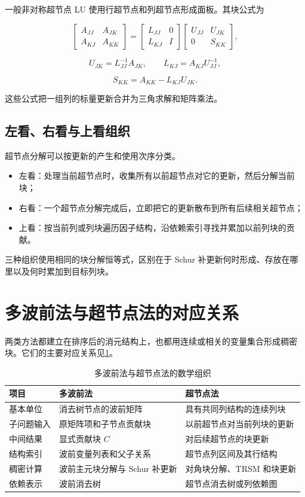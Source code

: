 一般非对称超节点 LU 使用行超节点和列超节点形成面板。其块公式为

\[
\begin{bmatrix}
A_{JJ}&A_{JK}\\
A_{KJ}&A_{KK}
\end{bmatrix}
=
\begin{bmatrix}
L_{JJ}&0\\L_{KJ}&I
\end{bmatrix}
\begin{bmatrix}
U_{JJ}&U_{JK}\\0&S_{KK}
\end{bmatrix},
\]

\[
U_{JK}=L_{JJ}^{-1}A_{JK},\qquad
L_{KJ}=A_{KJ}U_{JJ}^{-1},
\]

\[
S_{KK}=A_{KK}-L_{KJ}U_{JK}.
\]

这些公式把一组列的标量更新合并为三角求解和矩阵乘法。

\subsection{左看、右看与上看组织}

超节点分解可以按更新的产生和使用次序分类。

\begin{itemize}
  \item 左看：处理当前超节点时，收集所有以前超节点对它的更新，然后分解当前块；
  \item 右看：一个超节点分解完成后，立即把它的更新散布到所有后续相关超节点；
  \item 上看：按当前列或列块遍历因子结构，沿依赖索引寻找并累加以前列块的贡献。
\end{itemize}

三种组织使用相同的块分解恒等式，区别在于 Schur 补更新何时形成、存放在哪里以及何时累加到目标列块。

\section{多波前法与超节点法的对应关系}

两类方法都建立在排序后的消元结构上，也都用连续或相关的变量集合形成稠密块。它们的主要对应关系见\cref{tab:mf-sn}。

\begin{table}[htbp]
\centering
\caption{多波前法与超节点法的数学组织}
\label{tab:mf-sn}
\begin{tabularx}{\textwidth}{p{}XX}
\toprule
项目 & 多波前法 & 超节点法 \\
\midrule
基本单位 & 消去树节点的波前矩阵 & 具有共同列结构的连续列块 \\
子问题输入 & 原矩阵项和子节点贡献块 & 以前超节点对当前列块的更新 \\
中间结果 & 显式贡献块 $C$ & 对后续超节点的块更新 \\
结构索引 & 波前变量列表和父子关系 & 超节点列区间及其行结构 \\
稠密计算 & 波前主元块分解与 Schur 补更新 & 对角块分解、TRSM 和块更新 \\
依赖表示 & 波前消去树 & 超节点消去树或列依赖图 \\
\bottomrule
\end{tabularx}
\end{table}

